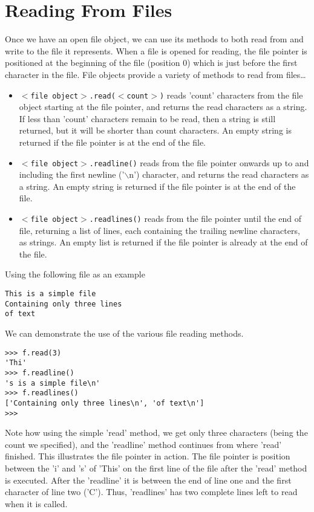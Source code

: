 \documentclass[a4paper,11pt]{article}
\begin{document}
\section{Reading From Files}

Once we have an open file object, we can use its methods to both   read from and write to the file it represents. When a file is opened   for reading, the file pointer is positioned at the beginning of the   file (position 0) which is just before the first character in the file.   File objects provide a variety of methods to read from files\ldots
\begin{itemize}
	\item 
\texttt{$<$file object$>$.read($<$count$>$)} reads    'count' characters from the file object starting at the file    pointer, and returns the read characters as a string. If less than    'count' characters remain to be read, then a string is still    returned, but it will be shorter than count characters. An empty    string is returned if the file pointer is at the end of the    file.
	\item 
\texttt{$<$file object$>$.readline()} reads from the file    pointer onwards up to and including the first newline ('$\backslash$n')    character, and returns the read characters as a string. An empty    string is returned if the file pointer is at the end of the    file.
	\item 
\texttt{$<$file object$>$.readlines()} reads from the    file pointer until the end of file, returning a list of lines, each    containing the trailing newline characters, as strings. An empty    list is returned if the file pointer is already at the end of the    file.
\end{itemize}

Using the following file as an example
\begin{lstlisting}
This is a simple file
Containing only three lines
of text\end{lstlisting}

We can demonstrate the use of the various file reading methods.
\begin{lstlisting}
>>> f.read(3)
'Thi'
>>> f.readline()
's is a simple file\n'
>>> f.readlines()
['Containing only three lines\n', 'of text\n']
>>>\end{lstlisting}

Note how using the simple 'read' method, we get only three   characters (being the count we specified), and the 'readline' method   continues from where 'read' finished. This illustrates the file pointer   in action. The file pointer is position between the 'i' and 's' of   'This' on the first line of the file after the 'read' method is   executed. After the 'readline' it is between the end of line one and   the first character of line two ('C'). Thus, 'readlines' has two   complete lines left to read when it is called.
\end{document}
